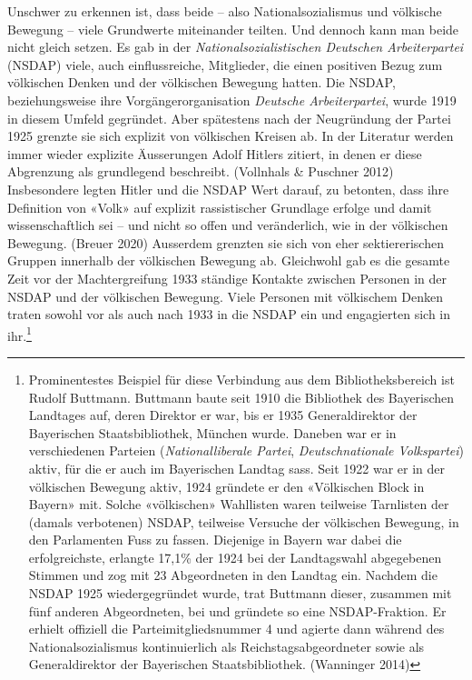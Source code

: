 \documentclass[a4paper,
fontsize=11pt,
oneside,
numbers=noperiodatend,
parskip=half-,
bibliography=totoc,
final
]{scrartcl}
\begin{document}
Unschwer zu erkennen ist, dass beide -- also Nationalsozialismus und
völkische Bewegung -- viele Grundwerte miteinander teilten. Und dennoch
kann man beide nicht gleich setzen. Es gab in der
\emph{Nationalsozialistischen Deutschen Arbeiterpartei} (NSDAP) viele, auch
einflussreiche, Mitglieder, die einen positiven Bezug zum völkischen
Denken und der völkischen Bewegung hatten. Die NSDAP, beziehungsweise
ihre Vorgängerorganisation \emph{Deutsche Arbeiterpartei}, wurde 1919 in
diesem Umfeld gegründet. Aber spätestens nach der Neugründung der Partei
1925 grenzte sie sich explizit von völkischen Kreisen ab. In der
Literatur werden immer wieder explizite Äusserungen Adolf Hitlers
zitiert, in denen er diese Abgrenzung als grundlegend beschreibt.
(Vollnhals \& Puschner 2012) Insbesondere legten Hitler und die NSDAP
Wert darauf, zu betonten, dass ihre Definition von «Volk» auf explizit
rassistischer Grundlage erfolge und damit wissenschaftlich sei -- und
nicht so offen und veränderlich, wie in der völkischen Bewegung. (Breuer
2020) Ausserdem grenzten sie sich von eher sektiererischen Gruppen
innerhalb der völkischen Bewegung ab. Gleichwohl gab es die gesamte Zeit
vor der Machtergreifung 1933 ständige Kontakte zwischen Personen in der
NSDAP und der völkischen Bewegung. Viele Personen mit völkischem Denken
traten sowohl vor als auch nach 1933 in die NSDAP ein und engagierten
sich in ihr.\footnote{Prominentestes Beispiel für diese Verbindung aus
  dem Bibliotheksbereich ist Rudolf Buttmann. Buttmann baute seit 1910
  die Bibliothek des Bayerischen Landtages auf, deren Direktor er war,
  bis er 1935 Generaldirektor der Bayerischen Staatsbibliothek, München
  wurde. Daneben war er in verschiedenen Parteien
  (\emph{Nationalliberale Partei}, \emph{Deutschnationale Volkspartei})
  aktiv, für die er auch im Bayerischen Landtag sass. Seit 1922 war er
  in der völkischen Bewegung aktiv, 1924 gründete er den «Völkischen
  Block in Bayern» mit. Solche «völkischen» Wahllisten waren teilweise
  Tarnlisten der (damals verbotenen) NSDAP, teilweise Versuche der
  völkischen Bewegung, in den Parlamenten Fuss zu fassen. Diejenige in
  Bayern war dabei die erfolgreichste, erlangte 17,1\% der 1924 bei der
  Landtagswahl abgegebenen Stimmen und zog mit 23 Abgeordneten in den
  Landtag ein. Nachdem die NSDAP 1925 wiedergegründet wurde, trat
  Buttmann dieser, zusammen mit fünf anderen Abgeordneten, bei und
  gründete so eine NSDAP-Fraktion. Er erhielt offiziell die
  Parteimitgliedsnummer 4 und agierte dann während des
  Nationalsozialismus kontinuierlich als Reichstagsabgeordneter sowie
  als Generaldirektor der Bayerischen Staatsbibliothek. (Wanninger 2014)}
\end{document}
